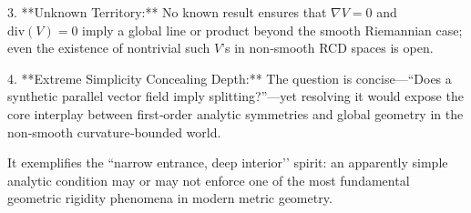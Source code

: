 3. **Unknown Territory:**  
   No known result ensures that \(\nabla V=0\) and \(\mathrm{div}(V)=0\) imply a global line or product beyond the smooth Riemannian case; even the existence of nontrivial such \(V\)'s in non‑smooth RCD spaces is open.

4. **Extreme Simplicity Concealing Depth:**  
   The question is concise—“Does a synthetic parallel vector field imply splitting?”—yet resolving it would expose the core interplay between first‑order analytic symmetries and global geometry in the non‑smooth curvature‑bounded world.

It exemplifies the “narrow entrance, deep interior’’ spirit: an apparently simple analytic condition may or may not enforce one of the most fundamental geometric rigidity phenomena in modern metric geometry.